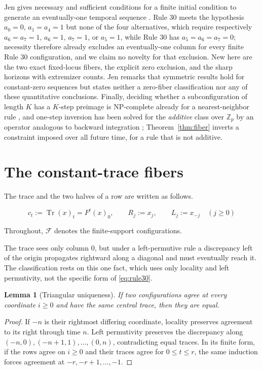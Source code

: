 \documentclass[11pt]{article}
\newtheorem{lemma}[theorem]{Lemma}
\newcommand{\F}{\mathcal F}
\newcommand{\Tr}{\operatorname{Tr}}
\begin{document}
Jen gives necessary and sufficient conditions for a finite initial condition to
generate an eventually-one temporal sequence \cite[Thm.~7a]{jen1986}.  Rule 30
meets the hypothesis $a_0=0$, $a_1=a_4=1$ but none of the four alternatives,
which require respectively $a_6=a_7=1$, $a_6=1$, $a_7=1$, or $a_5=1$, while
Rule 30 has $a_5=a_6=a_7=0$; necessity therefore already excludes an
eventually-one column for every finite Rule 30 configuration, and we claim no
novelty for that exclusion.  New here are the two exact fixed-locus fibers, the
explicit zero exclusion, and the sharp horizons with extremizer counts.  Jen
remarks that symmetric results hold for constant-zero sequences but states
neither a zero-fiber classification nor any of these quantitative conclusions.
Finally, deciding whether a subconfiguration of length $K$ has a $K$-step
preimage is NP-complete already for a nearest-neighbor rule \cite{green}, and
one-step inversion has been solved for the \emph{additive} class over
$\mathbb Z_p$ by an operator analogous to backward integration \cite{voorhees};
Theorem~\ref{thm:fiber} inverts a constraint imposed over all future time, for a
rule that is not additive.

\section{The constant-trace fibers}

The trace and the two halves of a row are written as follows.

\begin{equation}\label{eq:notation}
 c_t:=\Tr(x)_t=F^t(x)_0,\qquad R_j:=x_j,\qquad L_j:=x_{-j}\quad(j\geq0)
\end{equation}

Throughout, $\F$ denotes the finite-support configurations.

The trace sees only column $0$, but under a left-permutive rule a discrepancy
left of the origin propagates rightward along a diagonal and must eventually
reach it.  The classification rests on this one fact, which uses only locality
and left permutivity, not the specific form of \eqref{eq:rule30}.

\begin{lemma}[Triangular uniqueness]\label{lem:unique}
If two configurations agree at every coordinate $i\geq0$ and have the same
central trace, then they are equal.
\end{lemma}
\begin{proof}
If $-n$ is their rightmost differing coordinate, locality preserves agreement
to its right through time $n$.  Left permutivity preserves the discrepancy
along $(-n,0),(-n+1,1),\ldots,(0,n)$, contradicting equal traces.  In its
finite form, if the rows agree on $i\geq0$ and their traces agree for
$0\leq t\leq r$, the same induction forces agreement at
$-r,-r+1,\ldots,-1$.
\end{proof}
\end{document}
